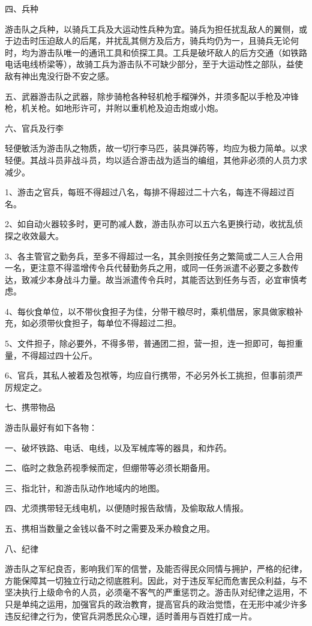 四、兵种

游击队之兵种，以骑兵工兵及大运动性兵种为宜。骑兵为担任扰乱敌人的翼侧，或于边击时压迫敌人的后尾，并扰乱其侧方及后方，骑兵均仍为一，且骑兵无论何时，均为游击队唯一的通讯工具和侦探工具。工兵是破坏敌人的后方交通（如铁路电话电线桥梁等），故骑工兵为游击队不可缺少部分，至于大运动性之部队，益使敌有神出鬼没行卧不安之感。

五、武器游击队之武器，除步骑枪各种轻机枪手榴弹外，并须多配以手枪及冲锋枪，机关枪。如地形许可，并附以重机枪及迫击炮或小炮。

六、官兵及行李

轻便敏活为游击队之物质，故一切行李马匹，装具弹药等，均应为极力简单。以求轻便。其战斗员非战斗员，均以适合游击战为适当的编组，其他非必须的人员力求减少。

1、游击之官兵，每班不得超过八名，每排不得超过二十六名，每连不得超过百名。

2、如自动火器较多时，更可酌减人数，游击队亦可以五六名更换行动，收扰乱侦探之收效最大。

3、各主管官之勤务兵，至多不得超过一名，其余则按任务之繁简或二人三人合用一名，更注意不得滥增传令兵代替勤务兵之用，或同一任务派遣不必要之多数传达，致减少本身战斗力量。故当派遣传令兵时，其能否达到任务与否，必宜审慎考虑。

4、每伙食单位，以不带伙食担子为佳，分带干粮尽时，乘机借居，家具做家粮补充，如必须带伙食担子，每单位不得超过二担。

5、文件担子，除必要外，不得多带，普通团二担，营一担，连一担即可，每担重量，不得超过四十公斤。

6、官兵，其私人被着及包袱等，均应自行携带，不必另外长工挑担，但事前须严厉规定之。

七、携带物品

游击队最好有如下各物：

一、破坏铁路、电话、电线，以及军械库等的器具，和炸药。

二、临时之救急药视季候而定，但绷带等必须长期备用。

三、指北针，和游击队动作地域内的地图。

四、尤须携带轻无线电机，以便随时报告敌情，及偷取敌人情报。

五、携相当数量之金钱以备不时之需要及釆办粮食之用。

八、纪律

游击队之军纪良否，影响我们军的信誉，及能否得民众同情与拥护，严格的纪律，方能保障其一切独立行动之彻底胜利。因此，对于违反军纪而危害民众利益，与不坚决执行上级命令的人员，必须毫不客气的严重惩罚之。游击队对纪律之运用，不只是单纯之运用，加强官兵的政治教育，提高官兵的政治觉悟，在无形中减少许多违反纪律之行为，使官兵洞悉民众心理，适时善用与百姓打成一片。


